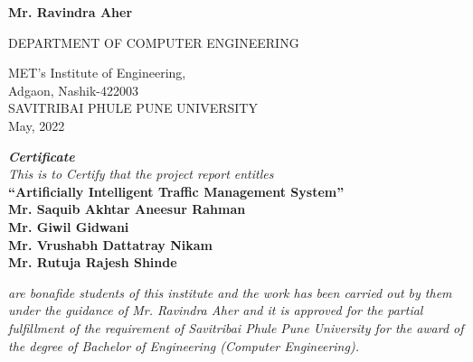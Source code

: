 \documentclass[openany,12pt]{report}
\begin{document}
\begin{titlepage}
\begin{center}
			{\bf Mr. Ravindra Aher}\\
			\vspace{0.4in}
			
			
			{\small DEPARTMENT OF COMPUTER ENGINEERING}\\
			\begin{figure}[h]
				\centerline{}
				\label{atcres}
			\end{figure}
			{\large MET's Institute of Engineering,}\\
			{\small Adgaon, Nashik-422003}\\
			SAVITRIBAI PHULE PUNE UNIVERSITY\\
			\vspace{0.2in}
			{\small May, 2022}
		\end{center}
	\end{titlepage}
	
	\fontsize{14}{16}
	\thispagestyle{empty}
	\begin{center}
		\begin{figure}[h]
			\centerline{}
			\label{atcres}
		\end{figure}
		\vspace{0.1in}
		{\it \Huge  \textbf{Certificate}}
		\vspace{0.2in}\\
		{\it This is to Certify that the project report entitles}\\
		\vspace{0.2in}
		{\Large \bf ``Artificially Intelligent Traffic Management System''}\\
		\vspace{0.2in}
	\fontsize{13}{15}	
		{\bf Mr. Saquib Akhtar Aneesur Rahman}\hspace*{\fill}{\bf (Exam Seat No. B150474298)}\\
		{\bf Mr. Giwil Gidwani}\hspace*{\fill}{\bf (Exam Seat No. B150474245)}\\
		{\bf Mr. Vrushabh Dattatray Nikam}\hspace*{\fill}{\bf (Exam Seat No. B150474278)}\\
		{\bf Mr. Rutuja Rajesh Shinde}\hspace*{\fill}{\bf (Exam Seat No. B150474304)}\\
		
	\end{center}
	\fontsize{14}{16}
	\vspace{0.3in}
	{\it are bonafide students of this institute and the work has been carried out by them under
		the guidance of Mr. Ravindra Aher and it is approved for the partial fulfillment of the
		requirement of Savitribai Phule Pune University for the award of the degree of Bachelor
		of Engineering (Computer Engineering).}\\
	\vspace{0.2in}
	\vspace{0.7in}
	\noindent
	
\end{document}
